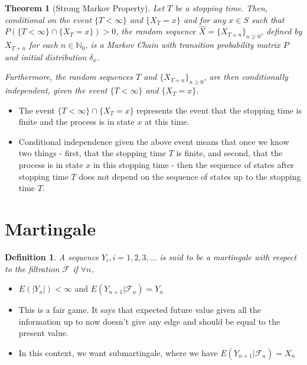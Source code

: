 \documentclass[11pt,reqno]{amsart}
\newtheorem{theorem}{Theorem}
\newtheorem{definition}{Definition}
\theoremstyle{remark}
\begin{document}
\begin{theorem}[Strong Markov Property]
Let \( T \) be a stopping time. Then, conditional on the event \( \{T < \infty\} \) and \( \{X_T = x\} \) and for any \( x \in S \) such that \( P(\{T < \infty\} \cap \{X_T = x\}) > 0 \), the random sequence \( \hat{X} = \{X_{T+n}\}_{n \geq 0} \), defined by \( X_{T+n} \) for each \( n \in \mathbb{N}_0 \), is a Markov Chain with transition probability matrix \( P \) and initial distribution \( \delta_x \).

Furthermore, the random sequences \( T \) and \( \{X_{T+n}\}_{n \geq 0} \), are then conditionally independent, given the event \( \{T < \infty\} \) and \( \{X_T = x\} \).
\end{theorem}
\begin{itemize}
\item The event \( \{T < \infty\} \cap \{X_T = x\} \) represents the event that the stopping time is finite and the process is in state \( x \) at this time.

\item Conditional independence given the above event means that once we know two things - first, that the stopping time \( T \) is finite, and second, that the process is in state \( x \) in this stopping time - then the sequence of states after stopping time \( T \) does not depend on the sequence of states up to the stopping time \( T \).
\end{itemize}

\section{Martingale}
\begin{definition}
A sequence \( Y_i, i = 1, 2, 3, \ldots \) is 
said to be a martingale with respect to the filtration \( \mathcal{F} \) if \( \forall n \),
\end{definition}
\begin{itemize}
\item \( E(|Y_n|) < \infty \) and \( E(Y_{n+1} | \mathcal{F}_n) = Y_n \)

\item This is a fair game. It says that expected future value given all the information up to now doesn't give any edge and should be equal to the present value.

\item In this context, we want submartingale, where we have \( E(Y_{n+1} | \mathcal{F}_n) = X_n \)
\end{itemize}
\end{document}
